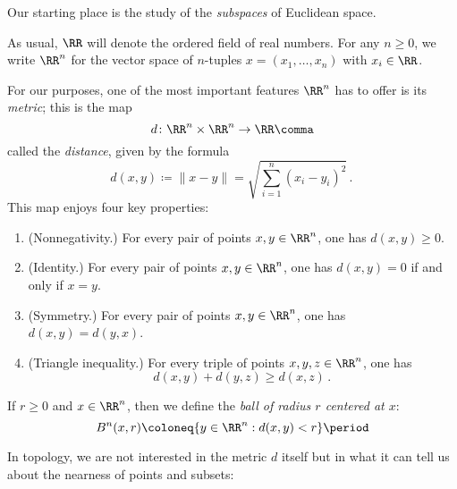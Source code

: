 
Our starting place is the study of the \emph{subspaces} of Euclidean space.

\begin{ntn}
	As usual, $\RR$ will denote the ordered field of real numbers.
	For any $ n\geq 0$, we write $\RR^n$ for the vector space of $n$-tuples $x = (x_1,\dots,x_n)$ with $x_i \in \RR$.
	
	For our purposes, one of the most important features $\RR^n$ has to offer is its \emph{metric};
	this is the map
	\[
		d \colon \RR^n \times \RR^n \to \RR \comma
	\]
	called the \emph{distance}, given by the formula
	\[
		d(x,y) \coloneq \|x - y\| = \sqrt{\sum_{i=1}^n (x_i-y_i)^2} \period
	\]
	This map enjoys four key properties:
	\begin{enumerate}
		\item (Nonnegativity.) For every pair of points $x,y \in \RR^n$, one has $d(x,y) \geq 0$.
		\item (Identity.) For every pair of points $x,y \in \RR^n$, one has $d(x,y)=0$ if and only if $x=y$.
		\item (Symmetry.) For every pair of points $x,y \in \RR^n$, one has $d(x,y) = d(y,x)$.
		\item (Triangle inequality.) For every triple of points $x,y,z \in \RR^n$, one has
			\[
				d(x,y) + d(y,z) \geq d(x, z) \period
			\]
	\end{enumerate}

	If $ r \geq 0$ and $ x \in \RR^n $, then we define the \emph{ball of radius $ r $ centered at $x$}:
		\[
			B^n(x,r) \coloneq \{ y \in \RR^n : d(x,y) <r \} \period
		\]
\end{ntn}

In topology, we are not interested in the metric $d$ itself but in what it can tell us about the nearness of points and subsets:

